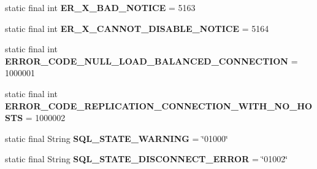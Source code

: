 \begin{DoxyCompactItemize}
\item 
\mbox{\label{classcom_1_1mysql_1_1cj_1_1exceptions_1_1_mysql_error_numbers_a8c9dd202ace10fc367d17820997c8301}} 
static final int {\bfseries E\+R\+\_\+\+X\+\_\+\+B\+A\+D\+\_\+\+N\+O\+T\+I\+CE} = 5163
\item 
\mbox{\label{classcom_1_1mysql_1_1cj_1_1exceptions_1_1_mysql_error_numbers_adb35e7c699293a4ac0b8dba9f35e9204}} 
static final int {\bfseries E\+R\+\_\+\+X\+\_\+\+C\+A\+N\+N\+O\+T\+\_\+\+D\+I\+S\+A\+B\+L\+E\+\_\+\+N\+O\+T\+I\+CE} = 5164
\item 
\mbox{\label{classcom_1_1mysql_1_1cj_1_1exceptions_1_1_mysql_error_numbers_a569e3a725777ee8515f13f8153494559}} 
static final int {\bfseries E\+R\+R\+O\+R\+\_\+\+C\+O\+D\+E\+\_\+\+N\+U\+L\+L\+\_\+\+L\+O\+A\+D\+\_\+\+B\+A\+L\+A\+N\+C\+E\+D\+\_\+\+C\+O\+N\+N\+E\+C\+T\+I\+ON} = 1000001
\item 
\mbox{\label{classcom_1_1mysql_1_1cj_1_1exceptions_1_1_mysql_error_numbers_a9f00974769f7d3c4495de1f02e1ad5ca}} 
static final int {\bfseries E\+R\+R\+O\+R\+\_\+\+C\+O\+D\+E\+\_\+\+R\+E\+P\+L\+I\+C\+A\+T\+I\+O\+N\+\_\+\+C\+O\+N\+N\+E\+C\+T\+I\+O\+N\+\_\+\+W\+I\+T\+H\+\_\+\+N\+O\+\_\+\+H\+O\+S\+TS} = 1000002
\item 
\mbox{\label{classcom_1_1mysql_1_1cj_1_1exceptions_1_1_mysql_error_numbers_ac6a1317aba8d23a2df7242bb60635d7a}} 
static final String {\bfseries S\+Q\+L\+\_\+\+S\+T\+A\+T\+E\+\_\+\+W\+A\+R\+N\+I\+NG} = \char`\"{}01000\char`\"{}
\item 
\mbox{\label{classcom_1_1mysql_1_1cj_1_1exceptions_1_1_mysql_error_numbers_a389f275fdda1462c46cff5be7155b463}} 
static final String {\bfseries S\+Q\+L\+\_\+\+S\+T\+A\+T\+E\+\_\+\+D\+I\+S\+C\+O\+N\+N\+E\+C\+T\+\_\+\+E\+R\+R\+OR} = \char`\"{}01002\char`\"{}
\item 
\mbox{\label{classcom_1_1mysql_1_1cj_1_1exceptions_1_1_mysql_error_numbers_ae1865d54dbec5c0e52357a11e61cb62b}} 

\end{DoxyCompactItemize}
